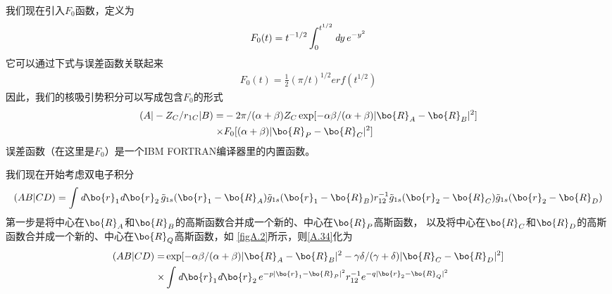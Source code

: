 我们现在引入$F_0$函数，定义为
\begin{align}
	\label{A.31}
	F_0(t)=t^{-1/2}\int_0^{t^{1/2}}\emph{d}y\,e^{-y^2}
\end{align}
它可以通过下式与误差函数关联起来
\begin{align}
	\label{A.32}
	F_0(t)=\frac{1}{2}(\pi/t)^{1/2}erf(t^{1/2})
\end{align}
因此，我们的核吸引势积分可以写成包含$F_0$的形式
\begin{align}
	\label{A.33}
	(A|-Z_C/r_{1C}|B)=&-2\pi/(\alpha+\beta) Z_C\exp[-\alpha\beta/(\alpha+\beta)|\bo{R}_A-\bo{R}_B|^2]
	\nonumber\\
	\times&F_0[(\alpha+\beta)|\bo{R}_P-\bo{R}_C|^2]
\end{align}
误差函数（在这里是$F_0$）是一个IBM FORTRAN编译器里的内置函数。

我们现在开始考虑双电子积分
\begin{align}
	\label{A.34}
	(AB|CD)=\int\emph{d}\bo{r}_1\emph{d}\bo{r}_2\,\tilde{g}_{1s}(\bo{r}_1-\bo{R}_A)
	\tilde{g}_{1s}(\bo{r}_1-\bo{R}_B)r_{12}^{-1}\tilde{g}_{1s}(\bo{r}_2-\bo{R}_C)\tilde{g}_{1s}(\bo{r}_2-\bo{R}_D)
\end{align}
第一步是将中心在$\bo{R}_A$和$\bo{R}_B$的高斯函数合并成一个新的、中心在$\bo{R}_P$高斯函数，
以及将中心在$\bo{R}_C$和$\bo{R}_D$的高斯函数合并成一个新的、中心在$\bo{R}_Q$高斯函数，如
\autoref{figA.2}所示，则\autoref{A.34}化为
\begin{align}
	\label{A.35}
	(AB|CD)=&\exp[-\alpha\beta/(\alpha+\beta)|\bo{R}_A-\bo{R}_B|^2-\gamma\delta/(\gamma+\delta)|\bo{R}_C-\bo{R}_D|^2]
	\nonumber\\
	\times&\int\emph{d}\bo{r}_1\emph{d}\bo{r}_2\,e^{-p\lvert \bo{r}_1-\bo{R}_P \rvert ^2}r_{12}^{-1}e^{-q\lvert \bo{r}_2-\bo{R}_Q \rvert ^2}
\end{align}

